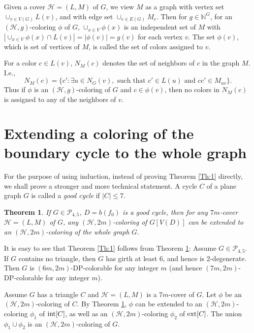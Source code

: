\documentclass{article}
\newtheorem{theorem}{Theorem}
\begin{document}
 
Given  a cover $\mathcal{H}=(L,M)$ of $G$, we 
  view $M$ as a graph with vertex set $\cup_{v \in V(G)}L(v)$, and with edge set 
 $\cup_{e \in E(G)}M_e$. Then for $g \in \mathbb{N}^G$, for an $(\mathcal{H}, g)$-coloring $\phi$ of $G$, $\cup_{x \in V}\phi(x)$  is an independent set   of $M$ with $|\cup_{x \in V}\phi(x) \cap L(v)| = |\phi(v)| = g(v)$ for each vertex $v$.  The set $\phi(v)$, which is set of vertices of $M$, is called the set of colors assigned to $v$.
 
 For a color $c \in L(v)$, $N_M(c)$ denotes the set of neighbors of $c$ in the graph $M$. I.e.,  
$$N_M(c) = \{c': \exists u \in N_G(v), \text{ such that }  c' \in L(u) \text{ and }  cc' \in M_{uv}\}.$$
Thus if $\phi$ is an $(\mathcal{H}, g)$-coloring   of $G$ and $c \in \phi(v)$, then no colors in $N_M(c)$ is assigned to any of the neighbors of $v$. 


\section{Extending a coloring of the boundary cycle to the whole graph}

 
For the purpose of using induction, instead of proving Theorem \ref{Th:1} directly, we shall prove a stronger and more technical statement.  A cycle $C$ of a plane graph $G$ is called a \textit{good cycle} if $|C| \le 7$. 

\begin{theorem}
\label{Th:2}
    If $G \in \mathcal{P}_{4,5}$,  $D=b(f_0)$ is a good cycle, then for any $7m$-cover $\mathcal{H}=(L,M)$ of $G$, any $(\mathcal{H},2m)$-coloring of $G[V(D)]$ can be extended to an $(\mathcal{H},2m)$-coloring of the whole graph $G$. 
\end{theorem}





It is easy to see that Theorem \ref{Th:1} follows from Theorem \ref{Th:2}: Assume $G\in \mathcal{P}_{4,5}$. If $G$ contains no triangle, then $G$ has girth at least $6$, and hence is 2-degenerate. Then $G$ is $(6m,2m)$-DP-colorable for any integer $m$ (and hence $(7m,2m)$-DP-colorable for any integer $m$).


Assume $G$ has a triangle $C$ and $\mathcal{H}=(L,M)$ is a $7m$-cover of $G$. Let $\phi$ be an $(\mathcal{H},2m)$-coloring of $C$. By Theorem \ref{Th:2}, $\phi$ can be extended to an $(\mathcal{H},2m)$-coloring $\phi_1$ of ${\rm int}[C]$, as well as an $(\mathcal{H},2m)$-coloring $\phi_2$ of ${\rm ext}[C]$.
The union $\phi_1 \cup \phi_2$ is an $(\mathcal{H},2m)$-coloring of $G$.
\end{document}
